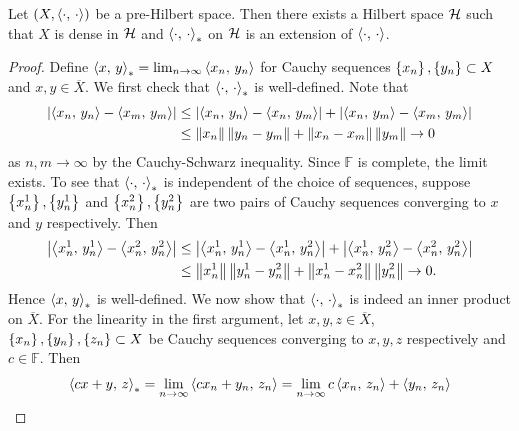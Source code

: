 \begin{theorem}
    Let $(X,\left\langle {\cdot},\, {\cdot} \right\rangle)$ be a pre-Hilbert space. Then there 
    exists a Hilbert space $\mathcal{H}$ such that $X$ is dense in $\mathcal{H}$ and 
    $\left\langle {\cdot},\, {\cdot} \right\rangle_*$ on $\mathcal{H}$ is an extension of $\left\langle {\cdot},\, {\cdot} \right\rangle$.
\end{theorem}
\begin{proof}
    Define $\left\langle {x},\, {y} \right\rangle_* = \lim_{n\to\infty}\left\langle {x_n},\, {y_n} \right\rangle$ for 
    Cauchy sequences $\left\{ {x_n} \right\},\left\{ {y_n} \right\}\subset X$ and $x,y\in\overline{X}$. 
    We first check that $\left\langle {\cdot},\, {\cdot} \right\rangle_*$ is well-defined. Note that 
    \begin{equation*}
        \begin{split}
            \left\lvert {\left\langle {x_n},\, {y_n} \right\rangle - \left\langle {x_m},\, {y_m} \right\rangle} \right\rvert 
            &\leq \left\lvert {\left\langle {x_n},\, {y_n} \right\rangle - \left\langle {x_n},\, {y_m} \right\rangle} \right\rvert + \left\lvert {\left\langle {x_n},\, {y_m} \right\rangle - \left\langle {x_m},\, {y_m} \right\rangle} \right\rvert \\
            &\leq \left\lVert {x_n} \right\rVert\left\lVert {y_n - y_m} \right\rVert + \left\lVert {x_n - x_m} \right\rVert\left\lVert {y_m} \right\rVert \to 0
        \end{split}
    \end{equation*}
    as $n,m\to\infty$ by the Cauchy-Schwarz inequality. Since $\mathbb{F}$ is 
    complete, the limit exists. To see that $\left\langle {\cdot},\, {\cdot} \right\rangle_*$ is 
    independent of the choice of sequences, suppose $\left\{ {x_n^1} \right\},\left\{ {y_n^1} \right\}$ 
    and $\left\{ {x_n^2} \right\},\left\{ {y_n^2} \right\}$ are two pairs of Cauchy sequences converging 
    to $x$ and $y$ respectively. Then 
    \begin{equation*}
        \begin{split}
            \left\lvert {\left\langle {x_n^1},\, {y_n^1} \right\rangle - \left\langle {x_n^2},\, {y_n^2} \right\rangle} \right\rvert 
            &\leq \left\lvert {\left\langle {x_n^1},\, {y_n^1} \right\rangle - \left\langle {x_n^1},\, {y_n^2} \right\rangle} \right\rvert + \left\lvert {\left\langle {x_n^1},\, {y_n^2} \right\rangle - \left\langle {x_n^2},\, {y_n^2} \right\rangle} \right\rvert \\
            &\leq \left\lVert {x_n^1} \right\rVert\left\lVert {y_n^1 - y_n^2} \right\rVert + \left\lVert {x_n^1 - x_n^2} \right\rVert\left\lVert {y_n^2} \right\rVert\to 0.
        \end{split}
    \end{equation*}
    Hence $\left\langle {x},\, {y} \right\rangle_*$ is well-defined. We now show that 
    $\left\langle {\cdot},\, {\cdot} \right\rangle_*$ is indeed an inner product on $\overline{X}$. 
    For the linearity in the first argument, let $x,y,z\in\overline{X}$, 
    $\left\{ {x_n} \right\},\left\{ {y_n} \right\},\left\{ {z_n} \right\}\subset X$ be Cauchy sequences converging to 
    $x,y,z$ respectively and $c\in\mathbb{F}$. Then 
    \begin{equation*}
        \begin{split}
            \inp{cx+y}{z}_* &= \lim_{n\to\infty}\inp{c x_n + y_n}{z_n} 
            = \lim_{n\to\infty}c\inp{x_n}{z_n} + \inp{y_n}{z_n} \\

\end{split}
\end{equation*}
\end{proof}

